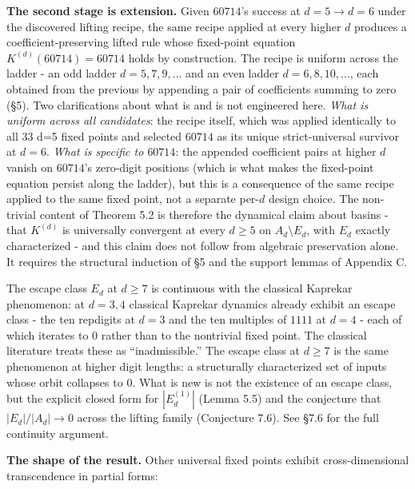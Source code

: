 \documentclass[11pt,letterpaper]{article}
\theoremstyle{paperstyle}
\theoremstyle{paperstyledef}
\theoremstyle{paperstylerem}
\begin{document}
\textbf{The second stage is extension.} Given \(60714\)'s success at
\(d = 5 \to d = 6\) under the discovered lifting recipe, the same recipe
applied at every higher \(d\) produces a coefficient-preserving lifted
rule whose fixed-point equation \(K^{(d)}(60714) = 60714\) holds by
construction. The recipe is uniform across the ladder - an odd ladder
\(d = 5, 7, 9, \ldots\) and an even ladder \(d = 6, 8, 10, \ldots\),
each obtained from the previous by appending a pair of coefficients
summing to zero (§5). Two clarifications about what is and is not
engineered here. \emph{What is uniform across all candidates}: the
recipe itself, which was applied identically to all \(33\) d=5 fixed
points and selected \(60714\) as its unique strict-universal survivor at
\(d = 6\). \emph{What is specific to \(60714\)}: the appended
coefficient pairs at higher \(d\) vanish on \(60714\)'s zero-digit
positions (which is what makes the fixed-point equation persist along
the ladder), but this is a consequence of the same recipe applied to the
same fixed point, not a separate per-\(d\) design choice. The
non-trivial content of Theorem 5.2 is therefore the dynamical claim
about basins - that \(K^{(d)}\) is universally convergent at every
\(d \geq 5\) on \(A_d \setminus E_d\), with \(E_d\) exactly
characterized - and this claim does not follow from algebraic
preservation alone. It requires the structural induction of §5 and the
support lemmas of Appendix C.

The escape class \(E_d\) at \(d \geq 7\) is continuous with the
classical Kaprekar phenomenon: at \(d = 3, 4\) classical Kaprekar
dynamics already exhibit an escape class - the ten repdigits at
\(d = 3\) and the ten multiples of \(1111\) at \(d = 4\) - each of
which iterates to \(0\) rather than to the nontrivial fixed point. The
classical literature treats these as ``inadmissible.'' The escape class
at \(d \geq 7\) is the same phenomenon at higher digit lengths: a
structurally characterized set of inputs whose orbit collapses to \(0\).
What is new is not the existence of an escape class, but the explicit
closed form for \(|E_d^{(1)}|\) (Lemma 5.5) and the conjecture that
\(|E_d|/|A_d| \to 0\) across the lifting family (Conjecture 7.6). See
§7.6 for the full continuity argument.

\textbf{The shape of the result.} Other universal fixed points exhibit
cross-dimensional transcendence in partial forms:
\end{document}
